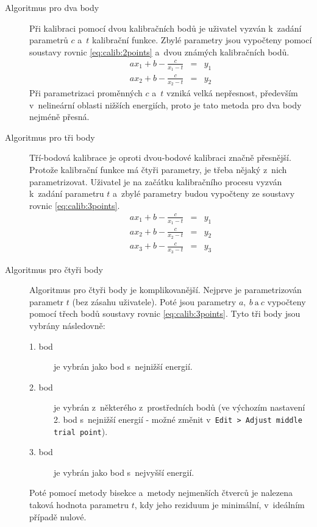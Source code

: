 \begin{description}
	\item[Algoritmus pro dva body]
	Při kalibraci pomocí dvou kalibračních bodů je uživatel vyzván k~zadání parametrů $c$ a~$t$ kalibrační funkce. Zbylé parametry jsou vypočteny pomocí soustavy rovnic \ref{eq:calib:2points} a~dvou známých kalibračních bodů.
	\begin{eqnarray}\label{eq:calib:2points}
		ax_{1} + b - \frac{c}{x_{1}-t} &=& y_{1} \\
		ax_{2} + b - \frac{c}{x_{2}-t} &=& y_{2} \nonumber 
	\end{eqnarray}
	Při parametrizaci proměnných $c$ a~$t$ vzniká velká nepřesnost, především v~nelineární oblasti nižších energiích, proto je tato metoda pro dva body nejméně přesná.

	\item[Algoritmus pro tři body]
	Tří-bodová kalibrace je oproti dvou-bodové kalibraci značně přesnější. Protože kalibrační funkce má čtyři parametry, je třeba nějaký z~nich parametrizovat. Uživatel je na začátku kalibračního procesu vyzván k~zadání parametru $t$ a~zbylé parametry budou vypočteny ze soustavy rovnic \ref{eq:calib:3points}.
	\begin{eqnarray}\label{eq:calib:3points}
		ax_{1} + b - \frac{c}{x_{1}-t} &=& y_{1} \nonumber \\
		ax_{2} + b - \frac{c}{x_{2}-t} &=& y_{2} \\
		ax_{3} + b - \frac{c}{x_{3}-t} &=& y_{3}\nonumber 
	\end{eqnarray}

	\item[Algoritmus pro čtyři body]
	Algoritmus pro čtyři body je komplikovanější. Nejprve je parametrizován parametr $t$ (bez zásahu uživatele). Poté jsou parametry $a,~b~\text{a}~c$  vypočteny pomocí třech bodů soustavy rovnic \ref{eq:calib:3points}. Tyto tři body jsou vybrány následovně:
	\begin{description}
		\item[1. bod] je vybrán jako bod s~nejnižší energií.
		\item[2. bod] je vybrán z~některého z~prostředních bodů (ve výchozím nastavení 2. bod s~nejnižší energií - možné změnit v~\texttt{Edit > Adjust middle trial point}).
		\item[3. bod] je vybrán jako bod s~nejvyšší energií.
	\end{description}

	Poté pomocí metody bisekce a~metody nejmenších čtverců je nalezena taková hodnota parametru $t$, kdy jeho reziduum je minimální, v~ideálním případě nulové.


\end{description}
